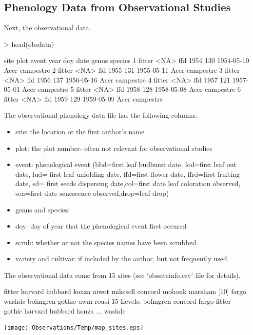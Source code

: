 \documentclass{article}
\begin{document}
\subsection{Phenology Data from Observational Studies}

Next, the observational data. 

\begin{Schunk}
\begin{Sinput}
> head(obsdata)
\end{Sinput}
\begin{Soutput}
    site plot event year doy       date genus   species
1 fitter <NA>   ffd 1954 130 1954-05-10  Acer campestre
2 fitter <NA>   ffd 1955 131 1955-05-11  Acer campestre
3 fitter <NA>   ffd 1956 137 1956-05-16  Acer campestre
4 fitter <NA>   ffd 1957 121 1957-05-01  Acer campestre
5 fitter <NA>   ffd 1958 128 1958-05-08  Acer campestre
6 fitter <NA>   ffd 1959 129 1959-05-09  Acer campestre
\end{Soutput}
\end{Schunk}

The observational phenology data file has the following columns:
\begin{itemize}
\item site: the location or the first author's name 
\item plot: the plot number- often not relevant for observational studies
\item event: phenological event (bbd=first leaf budburst date, lod=first leaf out date, lud= first leaf unfolding date, ffd=first flower date, ffrd=first fruiting date, sd= first seeds dispersing date,col=first date leaf coloration observed, sen=first date senescence observed,drop=leaf drop)
\item genus and species: 
\item doy: day of year that the phenological event first occured
\item scrub: whether or not the species names have been scrubbed.
\item variety and cultivar: if included by the author, but not frequently used
\end{itemize}

The observational data come from 15 sites (see `obssiteinfo.csv' file for details).

\begin{Schunk}
\begin{Soutput}
 [1] fitter   harvard  hubbard  konza    niwot    mikesell concord  mohonk   marsham 
[10] fargo    washdc   bolmgren gothic   uwm      rousi   
15 Levels: bolmgren concord fargo fitter gothic harvard hubbard konza ... washdc
\end{Soutput}
\end{Schunk}
\texttt{[image: Observations/Temp/map\_sites.eps]}
\end{document}
